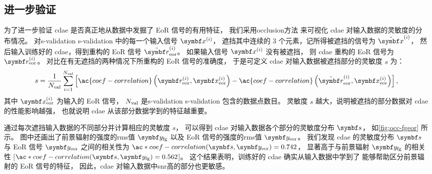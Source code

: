 \subsection{进一步验证}
\label{sec:cdae-validation}

为了进一步验证 \ac{cdae} 是否真正地从数据中发掘了 EoR 信号的有用特征，
我们采用\ac{occlusion}方法\cite{zeiler2014}
来可视化 \ac{cdae} 对输入数据的灵敏度的分布情况。
对\acl{s-validation} \ac{s-validation} 中的每一个输入信号 $\B{x}^{(i)}$，
遮挡其中连续的 3 个元素，记所得被遮挡的信号为 $\tilde{\B{x}}^{(i)}$，
然后输入训练好的 \ac{cdae}，得到重构的 EoR 信号 $\tilde{\B{r}}^{(i)}_{\R{eor}}$。
如果输入信号 $\B{x}^{(i)}$ 没有被遮挡，
则 \ac{cdae} 重构的 EoR 信号为 $\B{r}^{(i)}_{\R{eor}}$。
对比在有无遮挡的两种情况下所重构的 EoR 信号的准确度，
于是可定义 \ac{cdae} 对输入数据被遮挡部分的灵敏度 $s$ 为：
\begin{equation}
  \label{eq:perf-loss}
  s = \frac{1}{N_{\R{val}}} \sum_{i=1}^{N_{\R{val}}} \left[
      \ac{coef-correlation} \left(
        \B{r}^{(i)}_{\R{eor}}, \B{x}^{(i)}_{\R{eor}}
      \right) -
      \ac{coef-correlation} \left(
        \tilde{\B{r}}^{(i)}_{\R{eor}}, \B{x}^{(i)}_{\R{eor}}
      \right)
    \right] ,
\end{equation}
其中 $\B{x}^{(i)}_{\R{eor}}$ 为输入的 EoR 信号，
$N_{\mathrm{val}}$ 是\acl{s-validation} \ac{s-validation} 包含的数据点数目。
灵敏度 $s$ 越大，说明被遮挡的部分数据对 \ac{cdae} 的性能影响越强，
也就说明 \ac{cdae} 从该部分数据学到的特征越重要。

通过每次遮挡输入数据的不同部分并计算相应的灵敏度 $s$，
可以得到 \ac{cdae} 对输入数据各个部分的灵敏度分布 $\B{s}$，
如\autoref{fig:occ-fgeor} 所示。
图中还画出了前景辐射的强度的\acs*{rms}值 $\B{y}_{\R{fg}}$
以及 EoR 信号的强度的\acs*{rms}值 $\B{y}_{\R{eor}}$。
我们发现 \ac{cdae} 的灵敏度分布 $\B{s}$ 与 EoR 信号 $\B{y}_{\R{eor}}$
之间的相关性为 $\ac*{coef-correlation}(\B{s}, \B{y}_{\R{eor}}) = 0.742$，
显著高于与前景辐射 $\B{y}_{\R{fg}}$ 的相关性
[$\ac*{coef-correlation}(\B{s}, \B{y}_{\R{fg}}) = 0.562$]。
这个结果表明，训练好的 \ac{cdae} 确实从输入数据中学到了
能够帮助区分前景辐射的 EoR 信号的特征，
因此，\ac{cdae} 对输入数据中\ac{snr}高的部分也更敏感。

